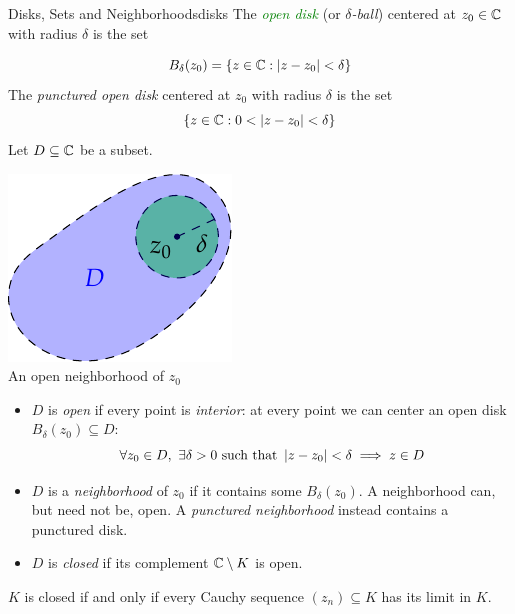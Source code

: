 \begin{defn}{Disks, Sets and Neighborhoods}{disks}
The \emph{\textcolor{Green}{open disk}} (or \emph{$\delta$-ball}) centered at $z_0\in\mathbb{C}$ with radius $\delta$ is the set\par
\begin{minipage}[t]{0.65\linewidth}\vspace{-12pt}
\[B_\delta(z_0)=\{z\in\mathbb{C}:\left| z-z_0\right|<\delta\}\]
The \emph{punctured open disk} centered at $z_0$ with radius $\delta$ is the set
\[\{z\in\mathbb{C}:0<\left| z-z_0\right|<\delta\}\]
Let $D\subseteq \mathbb{C}$ be a subset.
\end{minipage}\hfill\begin{minipage}[t]{0.3\linewidth}\vspace{-16pt}
\centering\includegraphics{functions-open}\\
An open neighborhood of $z_0$
\end{minipage}\par
\begin{itemize}\itemsep2pt
	\item $D$ is \emph{open} if every point is \emph{interior}: at every point we can center an open disk $B_\delta(z_0)\subseteq D$:
	\[\forall z_0\in D, \ \exists \delta>0\text{ such that } \left| z-z_0\right|<\delta\implies z\in D\]
	\vspace{-20pt}
	\item $D$ is a \emph{neighborhood} of $z_0$ if it contains some $B_\delta(z_0)$. A neighborhood can, but need not be, open. A \emph{punctured neighborhood} instead contains a punctured disk.
	\item $D$ is \emph{closed} if its complement $\mathbb{C}\setminus K$ is open.
\end{itemize}
\end{defn}

\begin{thm}{}{}
$K$ is closed if and only if every Cauchy sequence $(z_n)\subseteq K$ has its limit in $K$.
\end{thm}
\goodbreak

